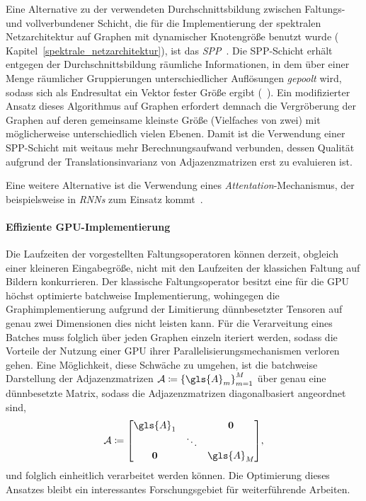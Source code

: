 Eine Alternative zu der verwendeten Durchschnittsbildung zwischen Faltungs- und vollverbundener Schicht, die für die Implementierung der spektralen Netzarchitektur auf Graphen mit dynamischer Knotengröße benutzt wurde (\vgl{} Kapitel~\ref{spektrale_netzarchitektur}), ist das \emph{\gls{SPP}}~\cite{spp}.
Die \gls{SPP}-Schicht erhält entgegen der Durchschnittsbildung räumliche Informationen, in dem über einer Menge räumlicher Gruppierungen unterschiedlicher Auflösungen \emph{gepoolt} wird, sodass sich als Endresultat ein Vektor fester Größe ergibt (\vgl{}~\cite{spp}).
Ein modifizierter Ansatz dieses Algorithmus auf Graphen erfordert demnach die Vergröberung der Graphen auf deren gemeinsame kleinste Größe (Vielfaches von zwei) mit möglicherweise unterschiedlich vielen Ebenen.
Damit ist die Verwendung einer \gls{SPP}-Schicht mit weitaus mehr Berechnungsaufwand verbunden, dessen Qualität aufgrund der Translationsinvarianz von Adjazenzmatrizen erst zu evaluieren ist.

Eine weitere Alternative ist die Verwendung eines \emph{Attentation}-Mechanismus, der beispielsweise in \emph{\glspl{RNN}} zum Einsatz kommt~\cite{attentation}.

\paragraph{Effiziente GPU-Implementierung}
\label{gpu_implementierung}

Die Laufzeiten der vorgestellten Faltungsoperatoren können derzeit, obgleich einer kleineren Eingabegröße, nicht mit den Laufzeiten der klassichen Faltung auf Bildern konkurrieren.
Der klassische Faltungsoperator besitzt eine für die GPU höchst optimierte batchweise Implementierung, wohingegen die Graphimplementierung aufgrund der Limitierung dünnbesetzter Tensoren auf genau zwei Dimensionen dies nicht leisten kann.
Für die Verarveitung eines Batches muss folglich über jeden Graphen einzeln iteriert werden, sodass die Vorteile der Nutzung einer GPU \bzgl{} ihrer Parallelisierungsmechanismen verloren gehen.
Eine Möglichkeit, diese Schwäche zu umgehen, ist die batchweise Darstellung der Adjazenzmatrizen $\mathcal{A} \coloneqq {\left\{\gls{A}_m\right\}}_{m=1}^M$ über genau eine dünnbesetzte Matrix, sodass die Adjazenzmatrizen diagonalbasiert angeordnet sind, \dhe{}
\begin{equation*}
  \mathcal{A} \coloneqq \begin{bmatrix}
  \gls{A}_1 & & \ma{0}\\
  & \ddots & \\
  \ma{0} & & \gls{A}_M
  \end{bmatrix},
\end{equation*}
und folglich einheitlich verarbeitet werden können.
Die Optimierung dieses Ansatzes bleibt ein interessantes Forschungsgebiet für weiterführende Arbeiten.
